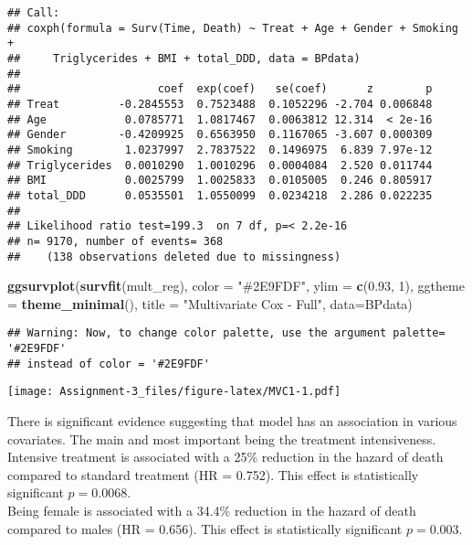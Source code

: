 \documentclass[
]{article}
\newenvironment{Shaded}{\begin{snugshade}}{\end{snugshade}}
\newcommand{\AttributeTok}[1]{\textcolor[rgb]{0.13,0.29,0.53}{#1}}
\newcommand{\DecValTok}[1]{\textcolor[rgb]{0.00,0.00,0.81}{#1}}
\newcommand{\FloatTok}[1]{\textcolor[rgb]{0.00,0.00,0.81}{#1}}
\newcommand{\FunctionTok}[1]{\textcolor[rgb]{0.13,0.29,0.53}{\textbf{#1}}}
\newcommand{\NormalTok}[1]{#1}
\newcommand{\StringTok}[1]{\textcolor[rgb]{0.31,0.60,0.02}{#1}}
\begin{document}
\begin{verbatim}
## Call:
## coxph(formula = Surv(Time, Death) ~ Treat + Age + Gender + Smoking + 
##     Triglycerides + BMI + total_DDD, data = BPdata)
## 
##                     coef  exp(coef)   se(coef)      z        p
## Treat         -0.2845553  0.7523488  0.1052296 -2.704 0.006848
## Age            0.0785771  1.0817467  0.0063812 12.314  < 2e-16
## Gender        -0.4209925  0.6563950  0.1167065 -3.607 0.000309
## Smoking        1.0237997  2.7837522  0.1496975  6.839 7.97e-12
## Triglycerides  0.0010290  1.0010296  0.0004084  2.520 0.011744
## BMI            0.0025799  1.0025833  0.0105005  0.246 0.805917
## total_DDD      0.0535501  1.0550099  0.0234218  2.286 0.022235
## 
## Likelihood ratio test=199.3  on 7 df, p=< 2.2e-16
## n= 9170, number of events= 368 
##    (138 observations deleted due to missingness)
\end{verbatim}

\begin{Shaded}
\begin{Highlighting}[]
\FunctionTok{ggsurvplot}\NormalTok{(}\FunctionTok{survfit}\NormalTok{(mult\_reg), }\AttributeTok{color =} \StringTok{"\#2E9FDF"}\NormalTok{,}
           \AttributeTok{ylim =} \FunctionTok{c}\NormalTok{(}\FloatTok{0.93}\NormalTok{, }\DecValTok{1}\NormalTok{),}
           \AttributeTok{ggtheme =} \FunctionTok{theme\_minimal}\NormalTok{(),}
           \AttributeTok{title =} \StringTok{"Multivariate Cox {-} Full"}\NormalTok{,}
           \AttributeTok{data=}\NormalTok{BPdata)}
\end{Highlighting}
\end{Shaded}

\begin{verbatim}
## Warning: Now, to change color palette, use the argument palette= '#2E9FDF'
## instead of color = '#2E9FDF'
\end{verbatim}

\texttt{[image: Assignment-3\_files/figure-latex/MVC1-1.pdf]}

There is significant evidence suggesting that model has an association
in various covariates. The main and most important being the treatment
intensiveness.\\
Intensive treatment is associated with a 25\% reduction in the hazard of
death compared to standard treatment (HR = 0.752). This effect is
statistically significant \(p=0.0068\).\\
Being female is associated with a 34.4\% reduction in the hazard of
death compared to males (HR = 0.656). This effect is statistically
significant \(p=0.003\).
\end{document}
